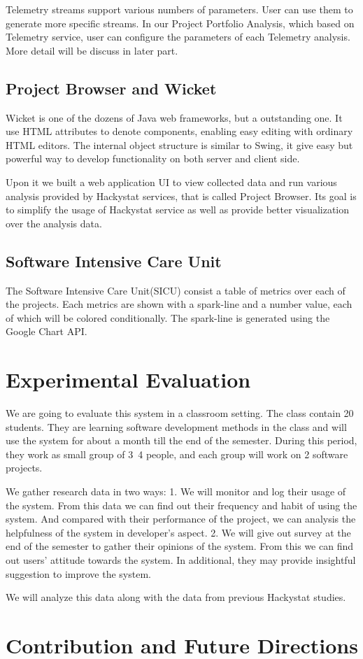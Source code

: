 Telemetry streams support various numbers of parameters. User can use them to generate more specific streams. In our Project Portfolio Analysis, which based on Telemetry service, user can configure the parameters of each Telemetry analysis. More detail will be discuss in later part.

\section {Project Browser and Wicket}
Wicket is one of the dozens of Java web frameworks, but a outstanding one. It use HTML attributes to denote components, enabling easy editing with ordinary HTML editors. The internal object structure is similar to Swing, it give easy but powerful way to develop functionality on both server and client side.

Upon it we built a web application UI to view collected data and run various analysis provided by Hackystat services, that is called Project Browser. Its goal is to simplify the usage of Hackystat service as well as provide better visualization over the analysis data.


\section {Software Intensive Care Unit}
The Software Intensive Care Unit(SICU) consist a table of metrics over each of the projects. Each metrics are shown with a spark-line and a number value, each of which will be colored conditionally. The spark-line is generated using the Google Chart API.\cite{googlechart}

\chapter{Experimental Evaluation}
We are going to evaluate this system in a classroom setting. The class contain 20 students. They are learning software development methods in the class and will use the system for about a month till the end of the semester. During this period, they work as small group of 3~4 people, and each group will work on 2 software projects.

We gather research data in two ways:
	1. We will monitor and log their usage of the system. From this data we can find out their frequency and habit of using the system. And compared with their performance of the project, we can analysis the helpfulness of the system in developer's aspect. 
	2. We will give out survey at the end of the semester to gather their opinions of the system. From this we can find out users' attitude towards the system. In additional, they may provide insightful suggestion to improve the system.

We will analyze this data along with the data from previous Hackystat studies.

\chapter{Contribution and Future Directions}
